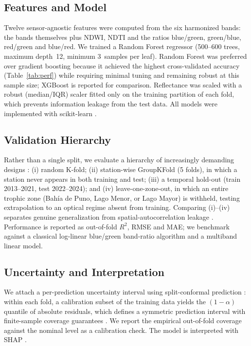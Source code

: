 \documentclass[remotesensing,article,submit,pdftex,moreauthors]{Definitions/mdpi}
\begin{document}
\subsection{Features and Model}
Twelve sensor-agnostic features were computed from the six harmonized bands: the
bands themselves plus NDWI, NDTI and the ratios blue/green, green/blue, red/green
and blue/red. We trained a Random Forest regressor \cite{Breiman2001} (500--600
trees, maximum depth~12, minimum 3~samples per leaf). Random Forest was preferred
over gradient boosting because it achieved the highest cross-validated accuracy
(Table~\ref{tab:perf}) while requiring minimal tuning and remaining robust at this
sample size; XGBoost \cite{Chen2016} is reported for comparison. Reflectance was
scaled with a robust (median/IQR) scaler fitted only on the training partition of
each fold, which prevents information leakage from the test data. All models were
implemented with scikit-learn \cite{Pedregosa2011}.

\subsection{Validation Hierarchy}
Rather than a single split, we evaluate a hierarchy of increasingly demanding
designs \cite{Roberts2017}: (i) random K-fold; (ii) station-wise GroupKFold (5
folds), in which a station never appears in both training and test; (iii) a
temporal hold-out (train 2013--2021, test 2022--2024); and (iv) leave-one-zone-out,
in which an entire trophic zone (Bah\'ia de Puno, Lago Menor, or Lago Mayor) is
withheld, testing extrapolation to an optical regime absent from training.
Comparing (i)--(iv) separates genuine generalization from spatial-autocorrelation
leakage \cite{Ploton2020,Meyer2019}. Performance is reported as out-of-fold $R^2$,
RMSE and MAE; we benchmark against a classical log-linear blue/green band-ratio
algorithm and a multiband linear model.

\subsection{Uncertainty and Interpretation}
We attach a per-prediction uncertainty interval using split-conformal prediction
\cite{Angelopoulos2023}: within each fold, a calibration subset of the training
data yields the $(1-\alpha)$ quantile of absolute residuals, which defines a
symmetric prediction interval with finite-sample coverage guarantees
\cite{Romano2019}. We report the empirical out-of-fold coverage against the nominal
level as a calibration check. The model is interpreted with SHAP
\cite{Lundberg2017,Lundberg2020}.
\end{document}
